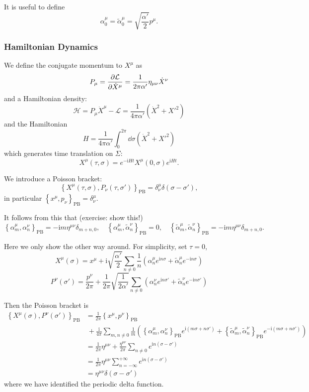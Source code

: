 \documentclass[a4paper,11pt]{article}
\begin{document}
	It is useful to define
	\[
		\alpha^\mu_0 = \tilde \alpha^\mu_0 = \sqrt{\frac{\alpha'}{2}} p^\mu.
	\]
	
	\subsubsection{Hamiltonian Dynamics}

	We define the conjugate momentum to $X^\mu$ as 
	\[
		P_\mu = \pdv{\mathcal{L}}{\dot X^\mu} = \frac{1}{2 \pi \alpha'} \eta _{\mu \nu}\dot X^\nu
	\]
	and a Hamiltonian density:
	\[
		\mathcal{H} = P_\mu \dot X^\mu - \mathcal{L} = \frac{1}{4 \pi \alpha'} \left( \dot X^2 + X'^2 \right)
	\]
	and the Hamiltonian
	\[
		H = \frac{1}{4 \pi \alpha'} \int_{0}^{2 \pi} \dd{\sigma} \left( \dot X^2 + X'^2 \right)
	\]
	which generates time translation on $\Sigma$:
	\[
		X^\mu (\tau, \sigma) = e ^{- \mathrm{i} H t}X^\mu(0,\sigma) e ^{\mathrm{i} H t}.
	\]

	We introduce a Poisson bracket:
	\[
		\left\{ X^\mu (\tau, \sigma), P_\nu (\tau ,\sigma') \right\}_{\mathrm{PB}} = \delta ^\mu_\nu \delta(\sigma - \sigma'),
	\]
	in particular $\left\{x^\mu, p_\nu\right\}_{\mathrm{PB}} = \delta^\mu_\nu$.
	
	It follows from this that (exercise: show this!)
	\[
		\left\{\alpha^\mu_m , \alpha^\nu_n\right\}_{\mathrm{PB}} = - \mathrm{i} m \eta ^{\mu \nu} \delta _{m+n,0}, \quad \left\{\alpha^\mu_m, \tilde \alpha^\nu_n\right\}_{\mathrm{PB}} = 0, \quad \left\{\tilde \alpha^\mu_m , \tilde \alpha^\nu_n\right\}_{\mathrm{PB}} = - \mathrm{i} m \eta ^{\mu \nu} \delta _{m+n,0}.
	\]

	Here we only show the other way around. For simplicity, set $\tau = 0$,
	\[
		X^\mu (\sigma) = x^\mu + \mathrm{i} \sqrt{\frac{\alpha'}{2}} \sum _{n \neq 0} \frac{1}{n} \left( \alpha^\mu_n e ^{\mathrm{i} n \sigma} + \tilde \alpha^\mu_n e ^{- \mathrm{i} n \sigma} \right)
	\]
	\[
		P^\nu (\sigma') = \frac{p^\nu}{2 \pi} + \frac{1}{2 \pi} \sqrt{\frac{1}{2 \alpha'}} \sum _{n \neq 0} \left( \alpha^\nu_n e ^{\mathrm{i} n \sigma'} + \tilde \alpha^\nu_n e ^{- \mathrm{i} n \sigma'} \right)
	\]
	
	Then the Poisson bracket is 
	\begin{align*}
		\left\{X^\mu(\sigma), P^\nu (\sigma')\right\}_{\mathrm{PB}} & = \frac{1}{2 \pi} \left\{x^\mu, p^\nu\right\}_{\mathrm{PB}}\\
		&\ + \frac{\mathrm{i}}{4 \pi}\sum _{m,n\neq 0} \frac{1}{m} \left( \left\{\alpha^\mu_m, \alpha^\nu_n\right\}_{\mathrm{PB}} e ^{\mathrm{i} (m \sigma + n \sigma')} + \left\{\tilde \alpha^\mu_m , \tilde \alpha^\nu_n\right\}_{\mathrm{PB}} e ^{- \mathrm{i} (m \sigma + n \sigma')} \right)\\
		& = \frac{1}{2 \pi} \eta ^{\mu \nu} + \frac{\eta ^{\mu \nu}}{2 \pi} \sum _{n \neq 0} e ^{\mathrm{i} n(\sigma - \sigma')}\\
		& = \frac{1}{2 \pi} \eta ^{\mu \nu} \sum _{n = -\infty}^{+ \infty} e ^{\mathrm{i} n (\sigma - \sigma')}\\
		& = \eta ^{\mu \nu} \delta (\sigma - \sigma')
	\end{align*}
	where we have identified the periodic delta function.
\end{document}
